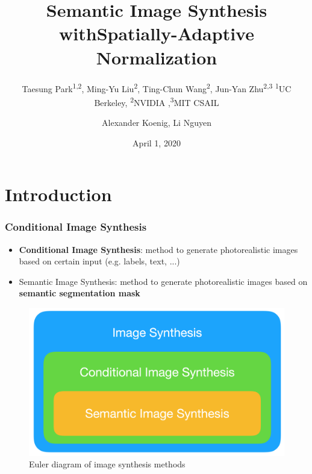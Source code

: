 \documentclass{beamer}
\begin{document}
\title{Semantic Image Synthesis with\newline  Spatially-Adaptive Normalization}
\subtitle{Taesung Park\textsuperscript{1,2}, Ming-Yu Liu\textsuperscript{2}, Ting-Chun Wang\textsuperscript{2}, Jun-Yan Zhu\textsuperscript{2,3} \newline \textsuperscript{1}UC Berkeley, \textsuperscript{2}NVIDIA ,\textsuperscript{3}MIT CSAIL}
\author{Alexander Koenig, Li Nguyen}
\date{April 1, 2020}

\frame{\titlepage} 

\section{Introduction}

\begin{frame}
\frametitle{Conditional Image Synthesis}
\begin{itemize}
	\item \textbf{Conditional Image Synthesis}: method to generate photorealistic images based on certain input (e.g. labels, text, ...) 
	\item Semantic Image Synthesis: method to generate photorealistic images based on \textbf{semantic segmentation mask}
\end{itemize}
\begin{figure}
\includegraphics[scale=0.2]{figures/subsets} 
\caption{Euler diagram of image synthesis methods}
\end{figure}
\end{frame}
\end{document}
